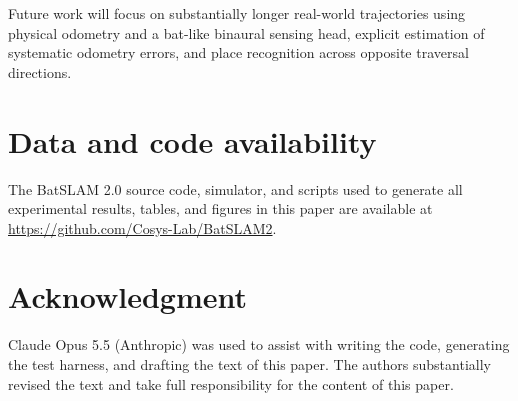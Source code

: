 Future work will focus on substantially longer real-world trajectories using physical odometry and a bat-like binaural sensing head, explicit estimation of systematic odometry errors, and place recognition across opposite traversal directions.

\section*{Data and code availability}

The BatSLAM 2.0 source code, simulator, and scripts used to generate all experimental results, tables, and figures in this paper are available at \url{https://github.com/Cosys-Lab/BatSLAM2}.

\section*{Acknowledgment}

Claude Opus 5.5 (Anthropic) was used to assist with writing the code, generating the test harness, and drafting the text of this paper. The authors substantially revised the text and take full responsibility for the content of this paper.